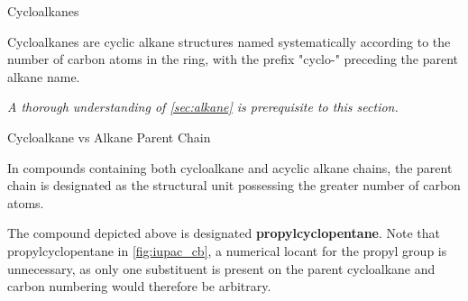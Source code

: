 \documentclass[10pt]{article}
\begin{document}
      \begin{core}{Cycloalkanes}

        Cycloalkanes are cyclic alkane structures named systematically according to the number of carbon atoms in the ring, with the prefix "cyclo-" preceding the parent alkane name.

        \vspace{-0.9cm}

        \textit{A thorough understanding of \autoref{sec:alkane} is prerequisite to this section.}

      \end{core}

      \begin{core}[label=core:cycloalkane_iupac]{Cycloalkane vs Alkane Parent Chain}

        In compounds containing both cycloalkane and acyclic alkane chains, the parent chain is designated as the structural unit possessing the greater number of carbon atoms.


        The compound depicted above is designated \textbf{propylcyclopentane}. Note that propylcyclopentane in \autoref{fig:iupac_cb}, a numerical locant for the propyl group is unnecessary, as only one substituent is present on the parent cycloalkane and carbon numbering would therefore be arbitrary.

      \end{core}
\end{document}
